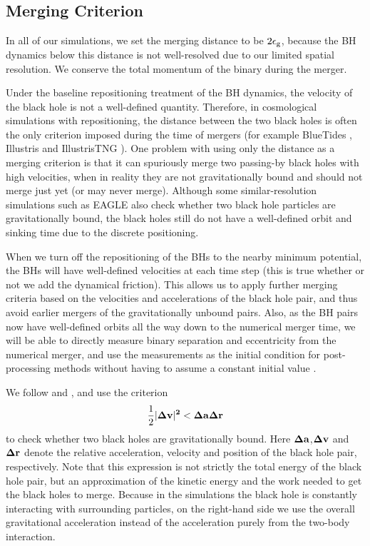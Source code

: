 \subsection{Merging Criterion}
\label{subsec:merger}
In all of our simulations, we set the merging distance to be $2\epsilon_{\rm g}$, because the BH dynamics below this distance is not well-resolved due to our limited spatial resolution. We conserve the total momentum of the binary during the merger.

Under the baseline repositioning treatment of the BH dynamics, the velocity of the black hole is not a well-defined quantity. Therefore, in cosmological simulations with repositioning, the distance between the two black holes is often the only criterion imposed during the time of mergers (for example BlueTides \citep{Feng2016}, Illustris \citep{Vogelsberger2013} and IllustrisTNG \citep{Pillepich2018}). One problem with using only the distance as a merging criterion is that it can spuriously merge two passing-by black holes with high velocities, when in reality they are not gravitationally bound and should not merge just yet (or may never merge). Although some similar-resolution simulations such as EAGLE \citep{Crain2015,Schaye2015} also check whether two black hole particles are gravitationally bound, the black holes still do not have a well-defined orbit and sinking time due to the discrete positioning.

When we turn off the repositioning of the BHs to the nearby minimum potential, the BHs will have well-defined velocities at each time step (this is true whether or not we add the dynamical friction). This allows us to apply further merging criteria based on the velocities and accelerations of the black hole pair, and thus avoid earlier mergers of the gravitationally unbound pairs. Also, as the BH pairs now have well-defined orbits all the way down to the numerical merger time, we will be able to directly measure binary separation and eccentricity from the numerical merger, and use the measurements as the initial condition for post-processing methods without having to assume a constant initial value \citep[e.g.][]{Kelley2017}.

We follow \cite{Bellovary2011} and \cite{Tremmel2017}, and use the criterion
\begin{equation}
    \label{eq:merge_criterion}
    \frac{1}{2}|\bf{\Delta v}|^2 < \bf{\Delta a} \bf{\Delta r}
\end{equation}
 to check whether two black holes are gravitationally bound. Here $\bf{\Delta a}$,$\bf{\Delta v}$ and $\bf{\Delta r}$ denote the relative acceleration, velocity and position of the black hole pair, respectively. Note that this expression is not strictly the total energy of the black hole pair, but an approximation of the kinetic energy and the work needed to get the black holes to merge. Because in the simulations the black hole is constantly interacting with surrounding particles, on the right-hand side we use the overall gravitational acceleration instead of the acceleration purely from the two-body interaction.
